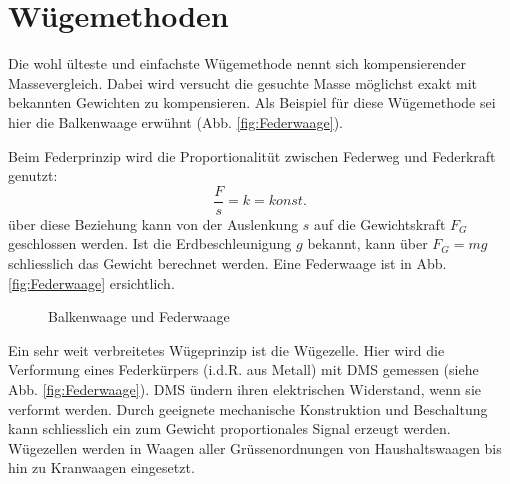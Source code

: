 \section{Wügemethoden}
Die  wohl ülteste und einfachste Wügemethode nennt sich
kompensierender Massevergleich. Dabei wird versucht die gesuchte Masse
möglichst exakt mit bekannten Gewichten zu kompensieren. Als Beispiel für diese Wügemethode sei hier die Balkenwaage erwühnt (Abb. \ref{fig:Federwaage}).

Beim 
Federprinzip wird die Proportionalitüt zwischen Federweg und Federkraft genutzt:
\begin{equation*}
\frac{F}{s} = k = konst.
\end{equation*}
über diese Beziehung kann von der Auslenkung $s$ auf die Gewichtskraft $F_G$ geschlossen werden. Ist die Erdbeschleunigung $g$ bekannt, kann über $F_G=m g$ schliesslich das Gewicht berechnet werden. \cite{kuchling} Eine Federwaage ist in Abb. \ref{fig:Federwaage} ersichtlich.

\begin{figure}[htb]
	\centering
		\hspace{2cm}
		\caption{Balkenwaage und Federwaage}
\end{figure}

Ein 
sehr weit verbreitetes Wügeprinzip ist die Wügezelle. Hier wird die Verformung eines Federkürpers (i.d.R. aus Metall) mit \ac{DMS} gemessen (siehe Abb. \ref{fig:Federwaage}). \ac{DMS} ündern ihren elektrischen Widerstand, wenn sie verformt werden. Durch geeignete mechanische Konstruktion und Beschaltung kann schliesslich ein zum Gewicht proportionales Signal erzeugt werden. Wügezellen werden in Waagen aller Grüssenordnungen von Haushaltswaagen bis hin zu Kranwaagen eingesetzt.

